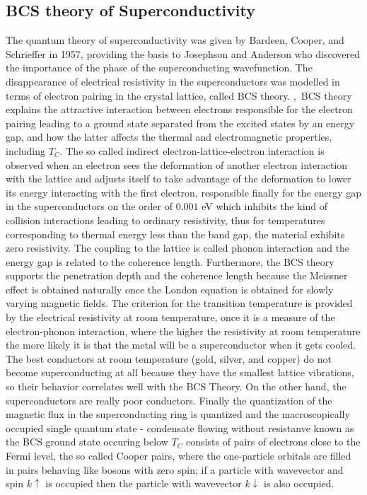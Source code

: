 \documentclass[openany,11pt,a4paper]{report}
\begin{document}
 
 
 
 
\subsection{BCS theory of Superconductivity} 
 
The quantum theory of superconductivity was given by Bardeen, Cooper, and Schrieffer in 1957, providing the basis to Josephson and Anderson who discovered the importance of the phase of the superconducting wavefunction. The disappearance of electrical resistivity in the superconductors was modelled in terms of electron pairing in the crystal lattice, called BCS theory. \cite{1},\cite{kittel}\  
BCS theory explains the attractive interaction between electrons responsible for the electron pairing leading to a ground state separated from the excited states by an energy gap, and how the latter affects the thermal and electromagnetic properties, including $T_{C}$. The so called indirect electron-lattice-electron interaction is observed when an electron sees the deformation of another electron interaction with the lattice and adjusts itself to take advantage of the deformation to lower its energy interacting with the first electron, responsible finally for the energy gap in the superconductors on the order of $0.001$ eV which inhibits the kind of collision interactions leading to ordinary resistivity, thus for temperatures corresponding to thermal energy less than the band gap, the material exhibits zero resistivity. The coupling to the lattice is called phonon interaction and the energy gap is related to the coherence length. Furthermore, the BCS theory supports the penetration depth and the coherence length because the Meissner effect is obtained naturally once the London equation is obtained for slowly varying magnetic fields. The criterion for the transition temperature is provided by the electrical
resistivity at room temperature, once it is a measure of the electron-phonon interaction, where the higher the resistivity at room temperature the more likely it is that the metal will be a superconductor when it gets cooled. The best conductors at room temperature (gold, silver, and copper) do not become superconducting at all because they have the smallest lattice vibrations, so their behavior correlates well with the BCS Theory. On the other hand, the superconductors are really poor conductors. Finally the  quantization of the magnetic flux in the superconducting ring is quantized and the macroscopically occupied single quantum state - condensate flowing without resistanve known as the BCS ground state occuring below $T_{C}$ consists of pairs of electrons close to the Fermi level, the so called Cooper pairs, where the one-particle orbitals are filled in pairs behaving like bosons with zero spin; if a particle with wavevector and spin $k\uparrow$ is occupied then the particle with wavevector $k\downarrow$ is also occupied.  \cite{kittel} 
\end{document}
